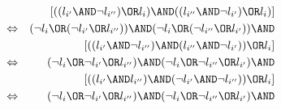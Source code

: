 {\begin{enumerate}
\begin{eqnarray*}
	&&[((l_{i^{\prime }} \AND\lnot l_{i^{\prime\prime }}) \OR l_{i}) \AND
	((l_{i^{\prime\prime }} \AND\lnot l_{i^{\prime }}) \OR l_{i})] \\
	&\Leftrightarrow &(\lnot l_{i}\OR(\lnot l_{i^{\prime }}\OR l_{i^{\prime
	\prime }}))\AND (\lnot l_{i}\OR(\lnot l_{i^{\prime \prime }}\OR l_{i^{\prime
	}}))\AND \\
	&&[((l_{i^{\prime }} \AND\lnot l_{i^{\prime\prime }}) \AND (l_{i^{\prime\prime }}
	\AND\lnot l_{i^{\prime }})) \OR l_{i}] \\
	&\Leftrightarrow &(\lnot l_{i}\OR\lnot l_{i^{\prime }}\OR l_{i^{\prime
	\prime }})\AND(\lnot l_{i}\OR\lnot l_{i^{\prime \prime }}\OR l_{i^{\prime }})%
	\AND \\
	&&[((l_{i^{\prime }} \AND l_{i^{\prime\prime }}) \AND (\lnot l_{i^{\prime }}\AND
	\lnot l_{i^{\prime\prime }})) \OR l_{i}] \\
	&\Leftrightarrow &(\lnot l_{i}\OR\lnot l_{i^{\prime }}\OR l_{i^{\prime
	\prime }})\AND(\lnot l_{i}\OR\lnot l_{i^{\prime \prime }}\OR l_{i^{\prime }})%
	\AND \\

\end{eqnarray*}
\end{enumerate}}
